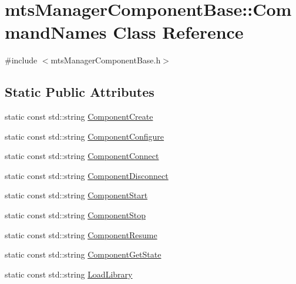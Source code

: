 \hypertarget{classmts_manager_component_base_1_1_command_names}{\section{mts\-Manager\-Component\-Base\-:\-:Command\-Names Class Reference}
\label{classmts_manager_component_base_1_1_command_names}
}


{\ttfamily \#include $<$mts\-Manager\-Component\-Base.\-h$>$}

\subsection*{Static Public Attributes}
\begin{DoxyCompactItemize}
\item 
static const std\-::string \hyperlink{classmts_manager_component_base_1_1_command_names_a626492bb2a1047dba2630effc9369845}{Component\-Create}
\item 
static const std\-::string \hyperlink{classmts_manager_component_base_1_1_command_names_a04c7cfcff4f8fb2714238b76f4dfcc1b}{Component\-Configure}
\item 
static const std\-::string \hyperlink{classmts_manager_component_base_1_1_command_names_ad15c418f6353bf966fa5b8a789ff4b03}{Component\-Connect}
\item 
static const std\-::string \hyperlink{classmts_manager_component_base_1_1_command_names_a3e40d4c8b07d7a552a98f423e1327765}{Component\-Disconnect}
\item 
static const std\-::string \hyperlink{classmts_manager_component_base_1_1_command_names_ae9bb155e348493addc9662716834a8ad}{Component\-Start}
\item 
static const std\-::string \hyperlink{classmts_manager_component_base_1_1_command_names_ac98b5846e8a3493bc33540b66db648e5}{Component\-Stop}
\item 
static const std\-::string \hyperlink{classmts_manager_component_base_1_1_command_names_ab626b2d820041797059ab01274902c0e}{Component\-Resume}
\item 
static const std\-::string \hyperlink{classmts_manager_component_base_1_1_command_names_a96cef8ff65e6f39681080b5e675a21af}{Component\-Get\-State}
\item 
static const std\-::string \hyperlink{classmts_manager_component_base_1_1_command_names_a16506481a4ed4160018c87e368cec962}{Load\-Library}
\item 

\end{DoxyCompactItemize}
